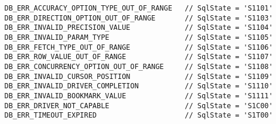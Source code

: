 \begin{verbatim}
   DB_ERR_ACCURACY_OPTION_TYPE_OUT_OF_RANGE   // SqlState = 'S1101'
   DB_ERR_DIRECTION_OPTION_OUT_OF_RANGE       // SqlState = 'S1103'
   DB_ERR_INVALID_PRECISION_VALUE             // SqlState = 'S1104'
   DB_ERR_INVALID_PARAM_TYPE                  // SqlState = 'S1105'
   DB_ERR_FETCH_TYPE_OUT_OF_RANGE             // SqlState = 'S1106'
   DB_ERR_ROW_VALUE_OUT_OF_RANGE              // SqlState = 'S1107'
   DB_ERR_CONCURRENCY_OPTION_OUT_OF_RANGE     // SqlState = 'S1108'
   DB_ERR_INVALID_CURSOR_POSITION             // SqlState = 'S1109'
   DB_ERR_INVALID_DRIVER_COMPLETION           // SqlState = 'S1110'
   DB_ERR_INVALID_BOOKMARK_VALUE              // SqlState = 'S1111'
   DB_ERR_DRIVER_NOT_CAPABLE                  // SqlState = 'S1C00'
   DB_ERR_TIMEOUT_EXPIRED                     // SqlState = 'S1T00'
\end{verbatim}



